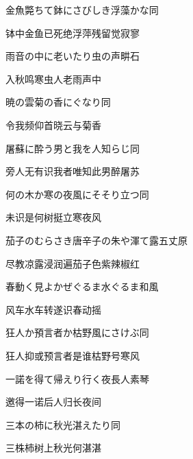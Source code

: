 \begin{haiku}
    {\FH 金魚斃ちて鉢にさびしき浮藻かな}\hfill{\FH 同}

    {\FK 钵中金鱼已死绝浮萍残留觉寂寥}
\end{haiku}

\begin{haiku}
    {\FH 雨音の中に老いたり虫の声}\hfill{\FH 畊石}

    {\FK 入秋鸣寒虫人老雨声中}
\end{haiku}

\begin{haiku}
    {\FH 暁の雲菊の香にぐなり}\hfill{\FH 同}

    {\FK 令我频仰首晓云与菊香}
\end{haiku}

\begin{haiku}
    {\FH 屠蘇に酔う男と我を人知らじ}\hfill{\FH 同}

    {\FK 旁人无有识我者唯知此男醉屠苏}
\end{haiku}

\begin{haiku}
    {\FH 何の木か寒の夜風にそそり立つ}\hfill{\FH 同}

    {\FK 未识是何树挺立寒夜风}
\end{haiku}

\begin{haiku}
    {\FH 茄子のむらさき唐辛子の朱や渾て露}\hfill{\FH 五丈原}

    {\FK 尽教凉露浸润遍茄子色紫辣椒红}
\end{haiku}

\begin{haiku}
    {\FH 春動く見よかぜぐるま水ぐるま}\hfill{\FH 和風}

    {\FK 风车水车转遂识春动摇}
\end{haiku}

\begin{haiku}
    {\FH 狂人か預言者か枯野風にさけぶ}\hfill{\FH 同}

    {\FK 狂人抑或预言者是谁枯野号寒风}
\end{haiku}

\begin{haiku}
    {\FH 一諾を得て帰えり行く夜長人}\hfill{\FH 素琴}

    {\FK 邀得一诺后人归长夜间}
\end{haiku}

\begin{haiku}
    {\FH 三本の柿に秋光湛えたり}\hfill{\FH 同}

    {\FK 三株柿树上秋光何湛湛}
\end{haiku}

